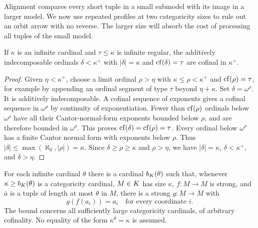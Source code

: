 Alignment compares every short tuple in a small submodel with its image
in a larger model.  We now use repeated profiles at two categoricity sizes
to rule out an orbit arrow with no reverse.  The larger size will absorb
the cost of processing all tuples of the small model.

\begin{lemma}
\label{found:indecomposable-occurrences}
If $\kappa$ is an infinite cardinal and $\tau\leq\kappa$
is infinite regular, the additively indecomposable
ordinals $\delta<\kappa^+$ with $|\delta|=\kappa$ and
$\operatorname{cf}(\delta)=\tau$ are cofinal in $\kappa^+$.
\end{lemma}

\begin{proof}
Given $\eta<\kappa^+$, choose a limit ordinal
$\rho>\eta$ with $\kappa\leq\rho<\kappa^+$ and
$\operatorname{cf}(\rho)=\tau$, for example by appending an ordinal
segment of type $\tau$ beyond $\eta+\kappa$.
Set $\delta=\omega^\rho$. It is additively
indecomposable. A cofinal sequence of exponents gives
a cofinal sequence in $\omega^\rho$ by continuity of
exponentiation. Fewer than $\operatorname{cf}(\rho)$ ordinals below
$\omega^\rho$ have all their Cantor-normal-form
exponents bounded below $\rho$, and are therefore
bounded in $\omega^\rho$. This proves
$\operatorname{cf}(\delta)=\operatorname{cf}(\rho)=\tau$.
Every ordinal below $\omega^\rho$
has a finite Cantor normal form with exponents below
$\rho$. Thus $|\delta|\leq\max(\aleph_0,|\rho|)=\kappa$.
Since $\delta\geq\rho\geq\kappa$ and $\rho>\eta$,
we have $|\delta|=\kappa$, $\delta<\kappa^+$, and
$\delta>\eta$.
\end{proof}

\begin{theorem}
\label{found:reversal}
For each infinite cardinal $\theta$ there is a cardinal
$b_K(\theta)$ such that, whenever
$\kappa\geq b_K(\theta)$ is a categoricity cardinal,
$M\in K$ has size $\kappa$, $f:M\longrightarrow M$
is strong, and $\bar a$ is a tuple of length at most
$\theta$ in $M$, there is a strong
$g:M\longrightarrow M$ with
\[
g(f(a_i))=a_i
\quad\text{for every coordinate }i.
\]
The bound concerns all sufficiently large categoricity
cardinals, of arbitrary cofinality. No equality of the
form $\kappa^\theta=\kappa$ is assumed.
\end{theorem}

